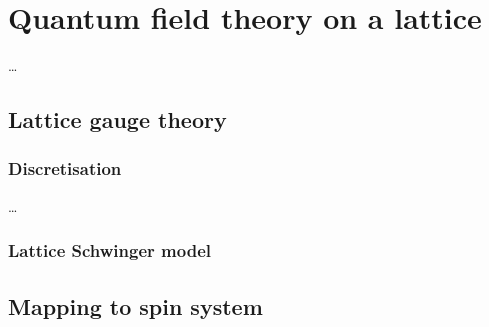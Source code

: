 \documentclass[../main.tex]{subfiles} %
\begin{document}
\chapter{Quantum field theory on a lattice} \label{chap:LatticeQFT}

\ldots



\section{Lattice gauge theory}

\subsection{Discretisation}

\ldots


\subsection{Lattice Schwinger model}

\lipsum



\section{Mapping to spin system}

\lipsum
\end{document}

